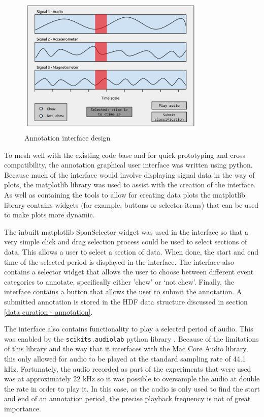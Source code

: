 \begin{figure}[ht!]
\begin{center}
\leavevmode
\includegraphics[width=0.8\textwidth]{images/annotation_interface_design.png}
\end{center}
\caption{Annotation interface design}
\label{annotationinterfacedesign}
\end{figure}

To mesh well with the existing code base and for quick prototyping and cross compatibility, the annotation graphical user interface was written using python. Because much of the interface would involve displaying signal data in the way of plots, the matplotlib library was used to assist with the creation of the interface. As well as containing the tools to allow for creating data plots the matplotlib library contains widgets (for example, buttons or selector items) that can be used to make plots more dynamic. 

The inbuilt matplotlib SpanSelector widget was used in the interface so that a very simple click and drag selection process could be used to select sections of data. This allows a user to select a section of data. When done, the start and end time of the selected period is displayed in the interface. The interface also contains a selector widget that allows the user to choose between different event categories to annotate, specifically either 'chew' or `not chew'. Finally, the interface contains a button that allows the user to submit the annotation. A submitted annotation is stored in the HDF data structure discussed in section \ref{data curation - annotation}. 

The interface also contains functionality to play a selected period of audio. This was enabled by the \texttt{scikits.audiolab} python library \cite{Cournapeau}. Because of the limitations of this library and the way that it interfaces with the Mac Core Audio library, this only allowed for audio to be played at the standard sampling rate of 44.1 kHz. Fortunately, the audio recorded as part of the experiments that were used was at approximately 22 kHz so it was possible to oversample the audio at double the rate in order to play it. In this case, as the audio is only used to find the start and end of an annotation period, the precise playback frequency is not of great importance. 

